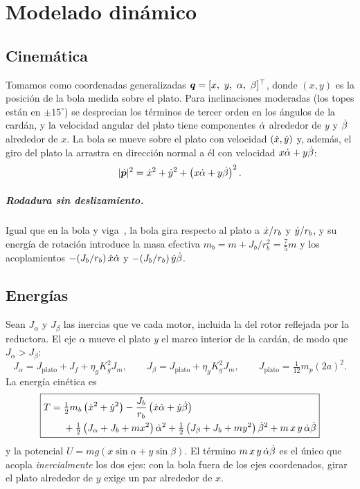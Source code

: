 \chapter{Modelado dinámico}
\label{cap:modelo}

\section{Cinemática}

Tomamos como coordenadas generalizadas $\bm{q}=[x,\ y,\ \alpha,\ \beta]^\top$, donde $(x,y)$ es la posición de la bola medida sobre el plato. Para inclinaciones moderadas (los topes están en $\pm15^\circ$) se desprecian los términos de tercer orden en los ángulos de la cardán, y la velocidad angular del plato tiene componentes $\dot{\alpha}$ alrededor de $y$ y $\dot{\beta}$ alrededor de $x$. La bola se mueve sobre el plato con velocidad $(\dot{x},\dot{y})$ y, además, el giro del plato la arrastra en dirección normal a él con velocidad $x\dot{\alpha}+y\dot{\beta}$:
\begin{equation}
  |\dot{\bm{p}}|^2 = \dot{x}^2 + \dot{y}^2 + \left(x\dot{\alpha} + y\dot{\beta}\right)^2 .
\end{equation}

\paragraph{Rodadura sin deslizamiento.} Igual que en la bola y viga~\cite{viga}, la bola gira respecto al plato a $\dot{x}/r_b$ y $\dot{y}/r_b$, y su energía de rotación introduce la masa efectiva $m_b=m+J_b/r_b^2=\tfrac75m$ y los acoplamientos $-(J_b/r_b)\,\dot{x}\dot{\alpha}$ y $-(J_b/r_b)\,\dot{y}\dot{\beta}$.

\section{Energías}

Sean $J_\alpha$ y $J_\beta$ las inercias que ve cada motor, incluida la del rotor reflejada por la reductora. El eje $\alpha$ mueve el plato \emph{y} el marco interior de la cardán, de modo que $J_\alpha>J_\beta$:
\begin{equation}
  J_\alpha = J_{\text{plato}} + J_f + \eta_gK_g^2J_m,\qquad
  J_\beta  = J_{\text{plato}} + \eta_gK_g^2J_m,\qquad
  J_{\text{plato}} = \tfrac{1}{12}m_p(2a)^2 .
  \label{eq:inercias}
\end{equation}
La energía cinética es
\begin{equation}
  \boxed{\begin{aligned}
  T ={}& \tfrac12 m_b\left(\dot{x}^2+\dot{y}^2\right) - \frac{J_b}{r_b}\left(\dot{x}\dot{\alpha}+\dot{y}\dot{\beta}\right)\\
    &+ \tfrac12\left(J_\alpha+J_b+mx^2\right)\dot{\alpha}^2 + \tfrac12\left(J_\beta+J_b+my^2\right)\dot{\beta}^2 + m\,x\,y\,\dot{\alpha}\dot{\beta}
  \end{aligned}}
  \label{eq:T}
\end{equation}
y la potencial $U=mg\left(x\sin\alpha+y\sin\beta\right)$. El término $m\,x\,y\,\dot{\alpha}\dot{\beta}$ es el único que acopla \emph{inercialmente} los dos ejes: con la bola fuera de los ejes coordenados, girar el plato alrededor de $y$ exige un par alrededor de $x$.

